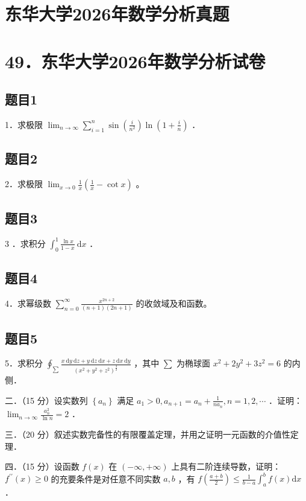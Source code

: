 \documentclass{article}
\begin{document}
\section*{东华大学2026年数学分析真题}
\section*{49．东华大学2026年数学分析试卷}

\subsection{题目1}
1．求极限 \(\lim _{n \rightarrow \infty} \sum_{i=1}^{n} \sin \left(\frac{i}{n^{2}}\right) \ln \left(1+\frac{i}{n}\right)\) ．

\subsection{题目2}
2．求极限 \(\lim _{x \rightarrow 0} \frac{1}{x}\left(\frac{1}{x}-\cot x\right)\) 。

\subsection{题目3}
3 ．求积分 \(\int_{0}^{1} \frac{\ln x}{1-x} \mathrm{~d} x\) ．

\subsection{题目4}
4．求幂级数 \(\sum_{n=0}^{\infty} \frac{x^{2 n+2}}{(n+1)(2 n+1)}\) 的收敛域及和函数。

\subsection{题目5}
5．求积分 \(\oint_{\sum} \frac{x \mathrm{~d} y \mathrm{~d} z+y \mathrm{~d} z \mathrm{~d} x+z \mathrm{~d} x \mathrm{~d} y}{\left(x^{2}+y^{2}+z^{2}\right)^{\frac{3}{2}}}\) ，其中 \(\sum\) 为椭球面 \(x^{2}+2 y^{2}+3 z^{2}=6\) 的内侧．

二．（15 分）设实数列 \(\left\{a_{n}\right\}\) 满足 \(a_{1}>0, a_{n+1}=a_{n}+\frac{1}{n a_{n}}, n=1,2, \cdots\) ．证明： \(\lim _{n \rightarrow \infty} \frac{a_{n}^{2}}{\ln n}=2\) ．

三．（20 分）叙述实数完备性的有限覆盖定理，并用之证明一元函数的介值性定理．

四．（15 分）设函数 \(f(x)\) 在 \((-\infty,+\infty)\) 上具有二阶连续导数，证明：\(f^{\prime \prime}(x) \geq 0\) 的充要条件是对任意不同实数 \(a, b\) ，有 \(f\left(\frac{a+b}{2}\right) \leq \frac{1}{b-a} \int_{a}^{b} f(x) \mathrm{d} x\) ．
\end{document}
